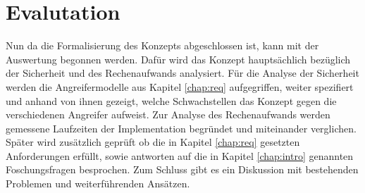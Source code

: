 \documentclass{scrreprt}
\begin{document}





\chapter{Evalutation}
\label{chap:auswertung}
Nun da die Formalisierung des Konzepts abgeschlossen ist, kann mit der Auswertung begonnen werden. Dafür wird das Konzept hauptsächlich bezüglich der Sicherheit und des Rechenaufwands analysiert. Für die Analyse der Sicherheit werden die Angreifermodelle aus Kapitel \ref{chap:req} aufgegriffen, weiter spezifiert und anhand von ihnen gezeigt, welche Schwachstellen das Konzept gegen die verschiedenen Angreifer aufweist. Zur Analyse des Rechenaufwands werden gemessene Laufzeiten der Implementation begründet und miteinander verglichen. Später wird zusätzlich geprüft ob die in Kapitel \ref{chap:req} gesetzten Anforderungen erfüllt, sowie antworten auf die in Kapitel \ref{chap:intro} genannten Foschungsfragen besprochen. Zum Schluss gibt es ein Diskussion mit bestehenden Problemen und weiterführenden Ansätzen.
\end{document}
